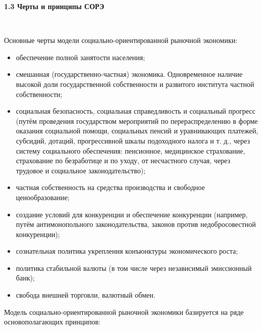 \documentclass[14pt,a4paper]{article}
\begin{document}
    \begin{center}
        \textbf{1.3 Черты и принципы СОРЭ}
    \end{center}
    \\
    \par
    Основные черты модели социально-ориентированной рыночной экономики:
    \begin{itemize}
        \item обеспечение полной занятости населения;
        \item смешанная (государственно-частная) экономика. Одновременное наличие высокой доли государственной собственности и развитого института частной собственности;
        \item социальная безопасность, социальная справедливость и социальный прогресс (путём проведения государством мероприятий по перераспределению в форме оказания социальной помощи, социальных пенсий и уравнивающих платежей, субсидий, дотаций, прогрессивной шкалы подоходного налога и т. д., через систему социального обеспечения: пенсионное, медицинское страхование, страхование по безработице и по уходу, от несчастного случая, через трудовое и социальное законодательство);
        \item частная собственность на средства производства и свободное ценообразование;
        \item создание условий для конкуренции и обеспечение конкуренции (например, путём антимонопольного законодательства, законов против недобросовестной конкуренции);
        \item сознательная политика укрепления конъюнктуры экономического роста;
        \item политика стабильной валюты (в том числе через независимый эмиссионный банк);
        \item свобода внешней торговли, валютный обмен.
    \end{itemize}
    \par
    Модель социально-ориентированной рыночной экономики базируется на ряде основополагающих принципов:
\end{document}
